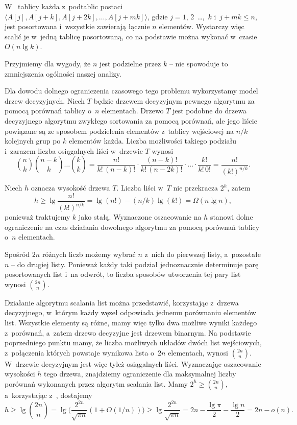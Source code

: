 \subproblem %
W~ tablicy każda z~podtablic postaci $\langle A[j],A[j+k],A[j+2k],\dots,A[j+mk]\rangle$, gdzie $j=1$, 2~\dots,~$k$ i~$j+mk\le n$, jest posortowana i~wszystkie zawierają łącznie $n$ elementów. Wystarczy więc scalić je w~jedną tablicę posortowaną, co na podstawie  można wykonać w~czasie $O(n\lg k)$.

\subproblem %
Przyjmiemy dla wygody, że $n$ jest podzielne przez $k$ -- nie spowoduje to zmniejszenia ogólności naszej analizy.

Dla dowodu dolnego ograniczenia czasowego tego problemu wykorzystamy model drzew decyzyjnych. Niech $T$ będzie drzewem decyzyjnym pewnego algorytmu  za pomocą porównań tablicy o~$n$ elementach. Drzewo $T$ jest podobne do drzewa decyzyjnego algorytmu zwykłego sortowania za pomocą porównań, ale jego liście powiązane są ze sposobem podzielenia elementów z~tablicy wejściowej na $n/k$ kolejnych grup po $k$ elementów każda. Liczba możliwości takiego podziału i~zarazem liczba osiągalnych liści w~drzewie $T$ wynosi
\[
    \binom{n}{k}\binom{n-k}{k}\dots\binom{k}{k} = \frac{n!}{k!\,(n-k)!}\cdot\frac{(n-k)!}{k!\,(n-2k)!}\cdot\ldots\cdot\frac{k!}{k!\,0!} = \frac{n!}{(k!)^{n/k}}.
\]

Niech $h$ oznacza wysokość drzewa $T$. Liczba liści w~$T$ nie przekracza $2^h$, zatem
\[
    h \ge \lg\frac{n!}{(k!)^{n/k}} = \lg(n!)-(n/k)\lg(k!) = \Omega(n\lg n),
\]
ponieważ traktujemy $k$ jako stałą. Wyznaczone oszacowanie na $h$ stanowi dolne ograniczenie na czas działania dowolnego algorytmu  za pomocą porównań tablicy o~$n$ elementach. 


\subproblem %
Spośród $2n$ różnych liczb możemy wybrać $n$ z~nich do pierwszej listy, a~pozostałe $n$ -- do drugiej listy. Ponieważ każdy taki podział jednoznacznie determinuje parę posortowanych list i~na odwrót, to liczba sposobów utworzenia tej pary list wynosi $\binom{2n}{n}$.

\subproblem %
Działanie algorytmu scalania list można przedstawić, korzystając z~drzewa decyzyjnego, w~którym każdy węzeł odpowiada jednemu porównaniu elementów list. Wszystkie elementy są różne, mamy więc tylko dwa możliwe wyniki każdego z~porównań, a~zatem drzewo decyzyjne jest drzewem binarnym. Na podstawie poprzedniego punktu mamy, że liczba możliwych układów dwóch  list wejściowych, z~połączenia których powstaje wynikowa lista o~$2n$ elementach, wynosi $\binom{2n}{n}$. W~drzewie decyzyjnym jest więc tyleż osiągalnych liści. Wyznaczając oszacowanie wysokości $h$ tego drzewa, znajdziemy ograniczenie dla maksymalnej liczby porównań wykonanych przez algorytm scalania list. Mamy $2^h\ge\binom{2n}{n}$, a~korzystając z~, dostajemy
\[
    h \ge \lg\binom{2n}{n} = \lg\biggl(\frac{2^{2n}}{\sqrt{\pi n}}(1+O(1/n))\biggr) \ge \lg\frac{2^{2n}}{\sqrt{\pi n}} = 2n-\frac{\lg\pi}{2}-\frac{\lg n}{2} = 2n-o(n).
\]

